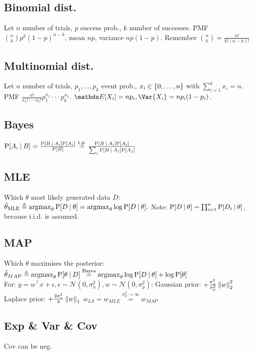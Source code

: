 \subsection{Binomial dist.}
Let $n$ number of trials, $p$ success prob., $k$ number of successes. PMF $\binom{n}{k}p^{k}(1-p)^{n-k}$, mean $np$,
variance $np(1-p)$. Remember $\binom{n}{k} = \frac{n!}{k!(n-k)!}$

\subsection{Multinomial dist.}
Let $n$ number of trials, $p_{1}, \dots, p_{k}$ event prob., $x_{i} \in \cset{0, \dots, n}$ with
$\sum_{i=1}^{k}x_{i} = n$. PMF $\frac{n!}{x_{1}!\cdot\cdot\cdot x_{k}!}p_{1}^{x_{1}}\cdot\cdot\cdot p_{k}^{x_{k}}$.
$\E{X_{i}} = np_{i}, \Var{X_{i}} = np_{i}(1 - p_{i})$.

\subsection{Bayes}
$\prob{A_{i}}[B] = \frac{\prob{B}[A_{i}]\prob{A_{i}}}{\prob{B}} \overset{\text{t.p.}}{=}
\frac{\prob{B}[A_{i}]\prob{A_{i}}}{\sum_{j}\prob{B}[A_{j}]\prob{A_{j}}}$

\subsection{MLE}
Which $\theta$ most likely generated data $D$:
$\hat{\theta}_{\text{MLE}} \triangleq \argmax_{\theta}\prob{D}[\theta] = \argmax_{\theta}\log\prob{D}[\theta].$
Note: $\prob{D}[\theta] = \prod_{i=1}^{n}\prob{D_{i}}[\theta]$, because i.i.d. is assumed.

\subsection{MAP}
Which $\theta$ maximises the posterior:
$\hat{\theta}_{MAP} \triangleq \argmax_{\theta}\prob{\theta}[D] \overset{\text{Bayes}}{=}
\argmax_{\theta}\log\prob{D}[\theta] + \log\prob{\theta}$\\
For: $y=w^{\top}x + \epsilon, \epsilon \sim \mathcal{N}(0, \sigma_{n}^{2}), w \sim \mathcal{N}(0, \sigma_{p}^{2})$:
Gaussian prior: $+\frac{\sigma_{n}^{2}}{\sigma_{p}^{2}} \left\lVert w\right\rVert_{2}^{2}$
Laplace prior: $+\frac{2\sigma_{n}^{2}}{b} \left\lVert w\right\rVert_{1}$
$w_{LS} = w_{MLE}\overset{\sigma_{p}^{2} \rightarrow \infty}{=} w_{MAP}$

\subsection{Exp \& Var \& Cov}
Cov can be neg.
